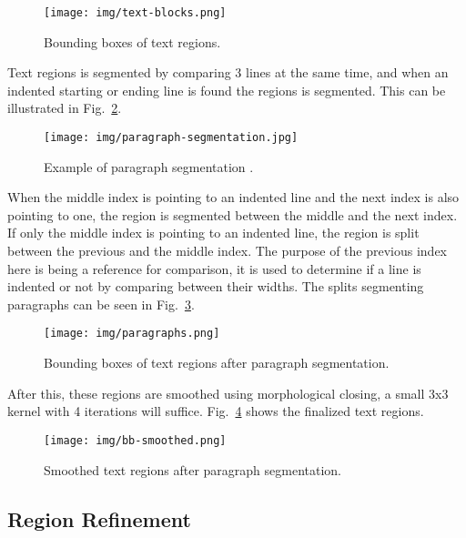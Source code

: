\documentclass[conference]{IEEEtran}
\begin{document}
    \begin{figure}[htbp]
        \centerline{\texttt{[image: img/text-blocks.png]}}
        \caption{Bounding boxes of text regions.}
        \label{img:text-blocks}
    \end{figure}

    Text regions is segmented by comparing 3 lines at the same time, and when an indented starting
    or ending line is found the regions is segmented.
    This can be illustrated in Fig.~\ref{fig:paragraph-segmentation}.

    \begin{figure}[htbp]
        \centerline{\texttt{[image: img/paragraph-segmentation.jpg]}}
        \caption{Example of paragraph segmentation \cite{mhs}.}
        \label{fig:paragraph-segmentation}
    \end{figure}

    When the middle index is pointing to an indented line and the next index is also pointing to one,
    the region is segmented between the middle and the next index.
    If only the middle index is pointing to an indented line, the region is split between the previous
    and the middle index.
    The purpose of the previous index here is being a reference for comparison, it is used to determine
    if a line is indented or not by comparing between their widths.
    The splits segmenting paragraphs can be seen in Fig.~\ref{img:paragraphs}.

    \begin{figure}[htbp]
        \centerline{\texttt{[image: img/paragraphs.png]}}
        \caption{Bounding boxes of text regions after paragraph segmentation.}
        \label{img:paragraphs}
    \end{figure}

    After this, these regions are smoothed using morphological closing, a small
    3x3 kernel with 4 iterations will suffice.
    Fig.~\ref{img:paragraphs-smoothed} shows the finalized text regions.

    \begin{figure}[htbp]
        \centerline{\texttt{[image: img/bb-smoothed.png]}}
        \caption{Smoothed text regions after paragraph segmentation.}
        \label{img:paragraphs-smoothed}
    \end{figure}

    \subsection{Region Refinement}
\end{document}
